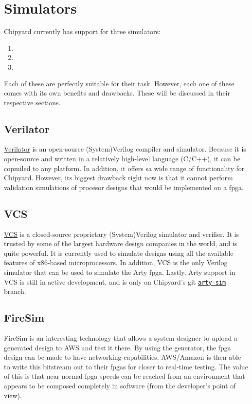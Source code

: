 \chapter{Simulators}\label{chap:Simulators}
Chipyard currently has support for three simulators:
\begin{enumerate}
\item {}
\item {}
\item {}
\end{enumerate}

Each of these are perfectly suitable for their task.
However, each one of these comes with its own benefits and drawbacks.
These will be discussed in their respective sections.

\section{Verilator}\label{sec:Verilator_Simulator}
\href{https://www.veripool.org/wiki/verilator}{Verilator} is an open-source (System)Verilog compiler and simulator.
Because it is open-source and written in a relatively high-level language (C/C++), it can be copmiled to any platform.
In addition, it offers sa wide range of functionality for Chipyard.
However, its biggest drawback right now is that it cannot perform validation simulations of procesor designs that would be implemented on a \gls{fpga}.

\section{VCS}\label{sec:VCS_Simulator}
\href{https://www.synopsys.com/verification/simulation/vcs.html}{VCS} is a closed-source proprietary (System)Verilog simulator and verifier.
It is trusted by some of the largest hardware design companies in the world, and is quite powerful.
It is currently used to simulate designs using all the available features of x86-based microprocessors.
In addition, VCS is the only Verilog simulator that can be used to simulate the Arty \Gls{fpga}.
Lastly, Arty support in VCS is still in active development, and is only on Chipyard's git \href{https://github.com/ucb-bar/chipyard/tree/arty-sim}{\texttt{arty-sim}} branch.

\section{FireSim}\label{sec:FireSim_Simulator}
\nocite{firesimPresentation}
FireSim is an interesting technology that allows a system designer to upload a generated design to AWS and test it there.
By using the  generator, the \gls{fpga} design can be made to have networking capabilities.
AWS/Amazon is then able to write this bitstream out to their \glspl{fpga} for closer to real-time testing.
The value of this is that near normal \gls{fpga} speeds can be reached from an environment that appears to be composed completely in software (from the developer's point of view).

